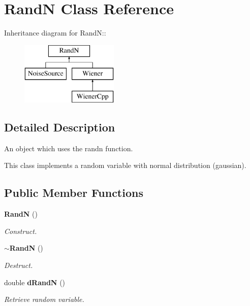 \section{RandN Class Reference}
\label{classRandN}
Inheritance diagram for RandN::\begin{figure}[H]
\begin{center}
\leavevmode
\includegraphics[height=3cm]{classRandN}
\end{center}
\end{figure}


\subsection{Detailed Description}
An object which uses the randn function. 

This class implements a random variable with normal distribution (gaussian). \subsection*{Public Member Functions}
\begin{CompactItemize}
\item 
{\bf RandN} ()\label{classRandN_e842af49a10a6dc84bdcf2a0cc643f98}

\begin{CompactList}\small\item\em Construct. \item\end{CompactList}\item 
{\bf $\sim$RandN} ()\label{classRandN_ffb47d3d5cb0d2c28e4d7b84f5ee81ff}

\begin{CompactList}\small\item\em Destruct. \item\end{CompactList}\item 
double {\bf dRandN} ()
\begin{CompactList}\small\item\em Retrieve random variable. \item\end{CompactList}\end{CompactItemize}


